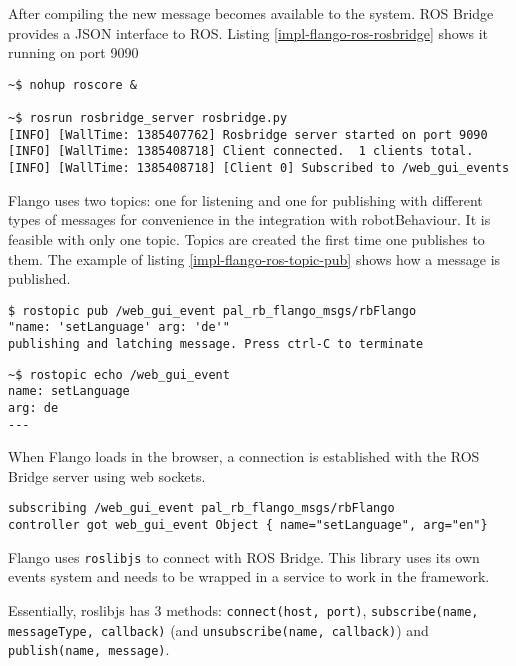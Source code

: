 After compiling the new message becomes available to the system.
ROS Bridge provides a \ac{JSON} interface to \ac{ROS}. Listing \ref{impl-flango-ros-rosbridge} shows it running on port 9090

\begin{lstlisting}[caption=ROS Bridge running, label=impl-flango-ros-rosbridge]
~$ nohup roscore &

~$ rosrun rosbridge_server rosbridge.py 
[INFO] [WallTime: 1385407762] Rosbridge server started on port 9090
[INFO] [WallTime: 1385408718] Client connected.  1 clients total.
[INFO] [WallTime: 1385408718] [Client 0] Subscribed to /web_gui_events

\end{lstlisting}

Flango \cm uses two topics: one for listening and one for publishing with different types of messages for convenience in the integration with robotBehaviour.
It is feasible with only one topic.
Topics are created the first time one publishes to them.
The example of listing \ref{impl-flango-ros-topic-pub} shows how a message is published.

\begin{lstlisting}[caption=Publishing to a topic, label=impl-flango-ros-topic-pub]
$ rostopic pub /web_gui_event pal_rb_flango_msgs/rbFlango 
"name: 'setLanguage' arg: 'de'" 
publishing and latching message. Press ctrl-C to terminate
\end{lstlisting}

\begin{lstlisting}[caption=Listening to a topic, label=impl-flango-ros-topic-echo]
~$ rostopic echo /web_gui_event
name: setLanguage
arg: de
---
\end{lstlisting}

When Flango \cm loads in the browser, a connection is established with the ROS Bridge server using web sockets.
\begin{lstlisting}[caption=Listening to a topic (Browser Console), label=impl-flango-ros-topic-browser]
subscribing /web_gui_event pal_rb_flango_msgs/rbFlango
controller got web_gui_event Object { name="setLanguage", arg="en"}
\end{lstlisting}

Flango \cm uses \texttt{roslibjs} to connect with ROS Bridge.
This library uses its own events system and needs to be wrapped in a service to work in the framework.

Essentially, roslibjs has 3 methods: \texttt{connect(host, port)}, \texttt{subscribe(name, messageType, callback)} (and \texttt{unsubscribe(name, callback)}) and \texttt{publish(name, message)}.

